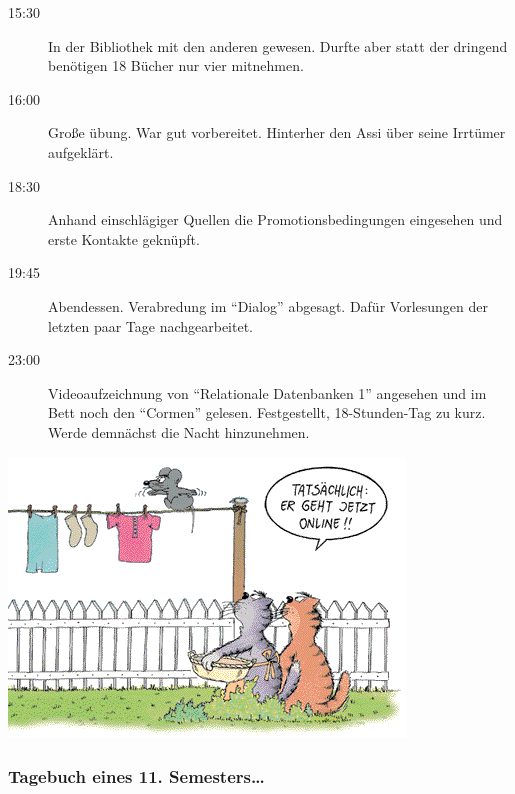 \begin{description}
\item[15:30] In der Bibliothek mit den anderen gewesen. Durfte aber statt der
dringend benötigen 18 Bücher nur vier mitnehmen.
\item[16:00] Große übung. War gut vorbereitet. Hinterher den Assi über seine
Irrtümer aufgeklärt.
\item[18:30] Anhand einschlägiger Quellen die Promotionsbedingungen eingesehen und
erste Kontakte geknüpft.
\item[19:45] Abendessen. Verabredung im "`Dialog"' abgesagt. Dafür Vorlesungen
der letzten paar Tage nachgearbeitet.
\item[23:00] Videoaufzeichnung von "`Relationale Datenbanken 1"' angesehen und im Bett noch den "`Cormen"'
gelesen. Festgestellt, 18-Stunden-Tag zu kurz. Werde demnächst die Nacht
hinzunehmen.
\end{description}
\begin{center}
  \includegraphics[width=\linewidth]{bilder/comics/stein1.png}
\end{center}
\newpage
\subsubsection{Tagebuch eines 11. Semesters\ldots}

